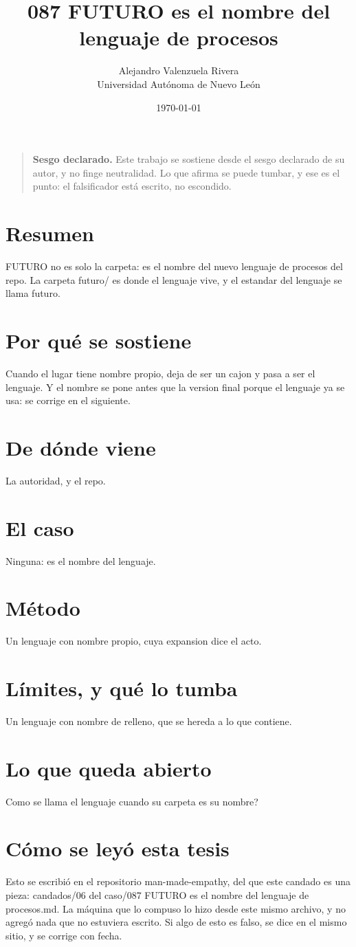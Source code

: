 \documentclass[11pt,a4paper]{article}
\title{087 FUTURO es el nombre del lenguaje de procesos}
\author{Alejandro Valenzuela Rivera\\\small Universidad Autónoma de Nuevo León}
\date{\today}
\begin{document}
\maketitle

\begin{quote}
\textbf{Sesgo declarado.} Este trabajo se sostiene desde el sesgo declarado de su autor, y no finge neutralidad. Lo que afirma se puede tumbar, y ese es el punto: el falsificador está escrito, no escondido.
\end{quote}

\section*{Resumen}
FUTURO no es solo la carpeta: es el nombre del nuevo lenguaje de procesos del repo. La carpeta futuro/ es donde el lenguaje vive, y el estandar del lenguaje se llama futuro.

\section{Por qué se sostiene}
Cuando el lugar tiene nombre propio, deja de ser un cajon y pasa a ser el lenguaje. Y el nombre se pone antes que la version final porque el lenguaje ya se usa: se corrige en el siguiente.

\section{De dónde viene}
La autoridad, y el repo.

\section{El caso}
Ninguna: es el nombre del lenguaje.

\section{Método}
Un lenguaje con nombre propio, cuya expansion dice el acto.

\section{Límites, y qué lo tumba}
Un lenguaje con nombre de relleno, que se hereda a lo que contiene.

\section{Lo que queda abierto}
\textquestiondown{}Como se llama el lenguaje cuando su carpeta es su nombre?

\section*{Cómo se leyó esta tesis}
Esto se escribió en el repositorio man-made-empathy, del que este candado es una pieza: candados/06 del caso/087 FUTURO es el nombre del lenguaje de procesos.md. La máquina que lo compuso lo hizo desde este mismo archivo, y no agregó nada que no estuviera escrito. Si algo de esto es falso, se dice en el mismo sitio, y se corrige con fecha.
\end{document}

